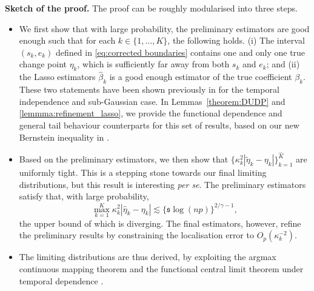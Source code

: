 \documentclass[11pt]{article}
\newcommand{\s}{ { \mathfrak{s}  } }
\theoremstyle{plain}
\theoremstyle{definition}
\begin{document}
\medskip
\noindent \textbf{Sketch of the proof.}  The proof can be roughly modularised into three steps.  
\begin{itemize}
    \item We first show that with large probability, the preliminary estimators are good enough such that for each $k \in \{1, \ldots, K\}$, the following holds. (i) The interval $(s_k, e_k)$ defined in \eqref{eq:corrected boundaries} contains one and only one true change point $\eta_k$, which is sufficiently far away from both $s_k$ and $e_k$; and (ii) the Lasso estimators $\widehat{\beta}_k$ is a good enough estimator of the true coefficient $\beta_k$.  These two statements have been shown previously in \cite{rinaldo2021localizing} for the temporal independence and sub-Gaussian case.  In Lemmas~\ref{theorem:DUDP} and \ref{lemmma:refinement_lasso}, we provide the functional dependence and general tail behaviour counterparts for this set of results, based on our new Bernstein inequality in .
    
    \item Based on the preliminary estimators, we then show that $\{\kappa_k^2|\widetilde{\eta}_k - \eta_k|\}_{k = 1}^{\widehat{K}}$ are uniformly tight.  This is a stepping stone towards our final limiting distributions, but this result is interesting \textit{per se}.  The preliminary estimators satisfy that, with large probability, 
    \[
        \max_{k = 1}^K \kappa_k^2|\widehat{\eta}_k - \eta_k| \lesssim \{\s \log(np)\}^{2/\gamma - 1},
    \]
    the upper bound of which is diverging.  The final estimators, however, refine the preliminary results by constraining the localisation error to $O_p(\kappa_k^{-2})$.
    \item The limiting distributions are thus derived, by exploiting the argmax continuous mapping theorem \citep[e.g.~Theorem~3.2.2~in][]{Vaart1996weak} and the functional central limit theorem under temporal dependence \citep[e.g.~Theorem~3~in][]{wu2011asymptotic}.
\end{itemize}
\end{document}
